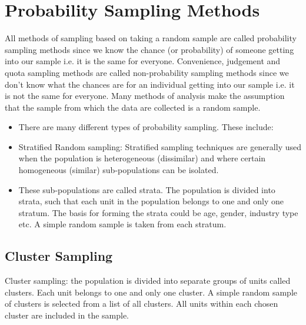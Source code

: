 ﻿\documentclass[]{report}
\begin{document}
\newpage
\section*{Probability Sampling Methods}

All methods of sampling based on taking a random sample are called probability sampling methods since we know the chance (or probability) of someone getting into our sample i.e. it is the same for everyone. Convenience, judgement and quota sampling methods are called non-probability sampling methods since we don’t know what the chances are for an individual getting into our sample i.e. it is not the same for everyone. Many methods of analysis make the assumption that the sample from which the data are collected is a random sample. 


\begin{itemize}
\item There are many different types of probability sampling. These include:

\item Stratified Random sampling: Stratified sampling techniques are generally used when the population is heterogeneous (dissimilar) and where certain homogeneous (similar) sub-populations can be isolated. 

\item These sub-populations are called strata. The population is divided into strata, such that each unit in the population belongs to one and only one stratum. The basis for forming the strata could be age, gender, industry type etc.  A simple random sample is taken from each stratum. 
\end{itemize}

\subsection*{Cluster Sampling}
Cluster sampling: the population is divided into separate groups of units called clusters. Each unit belongs to one and only one cluster. A simple random sample of clusters is selected from a list of all clusters. All units within each chosen cluster are included in the sample. 
\end{document}
